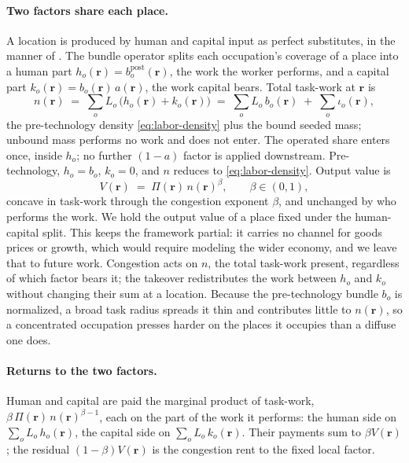 \documentclass[12pt, a4paper]{article}
\begin{document}
\paragraph{Two factors share each place.}
A location is produced by human and capital input as perfect
substitutes, in the manner of \textcite{acemoglu2018race}. The bundle
operator splits each occupation's coverage of a place into a human
part $h_o(\mathbf{r}) = b_o^{\text{post}}(\mathbf{r})$, the work the
worker performs, and a capital part
$k_o(\mathbf{r}) = b_o(\mathbf{r})\,a(\mathbf{r})$, the work capital
bears. Total task-work at $\mathbf{r}$ is
\begin{equation}
  n(\mathbf{r})
  \;=\;
  \sum_o L_o\,\bigl(h_o(\mathbf{r}) + k_o(\mathbf{r})\bigr)
  \;=\;
  \sum_o L_o\, b_o(\mathbf{r}) \;+\; \sum_o \iota_o(\mathbf{r}),
  \label{eq:taskwork-density}
\end{equation}
the pre-technology density \eqref{eq:labor-density} plus the bound
seeded mass; unbound mass performs no work and does not enter. The
operated share enters once, inside $h_o$; no further $(1 - a)$ factor
is applied downstream. Pre-technology, $h_o = b_o$, $k_o = 0$, and
$n$ reduces to \eqref{eq:labor-density}. Output value is
\begin{equation}
  V(\mathbf{r})
  \;=\;
  \Pi(\mathbf{r})\, n(\mathbf{r})^{\beta},
  \qquad \beta \in (0,1),
  \label{eq:place-output}
\end{equation}
concave in task-work through the congestion exponent $\beta$, and
unchanged by who performs the work. We hold the output value of a place
fixed under the human-capital split. This keeps the framework partial:
it carries no channel for goods prices or growth, which would require
modeling the wider economy, and we leave that to future work.
Congestion acts on $n$, the total task-work present, regardless of
which factor bears it; the takeover redistributes the work between
$h_o$ and $k_o$ without changing their sum at a location. Because
the pre-technology bundle $b_o$ is normalized, a broad task radius spreads it thin and
contributes little to $n(\mathbf{r})$, so a concentrated occupation
presses harder on the places it occupies than a diffuse one does.

\paragraph{Returns to the two factors.}
Human and capital are paid the marginal product of task-work,
$\beta\,\Pi(\mathbf{r})\, n(\mathbf{r})^{\beta-1}$, each on the part of
the work it performs: the human side on
$\sum_o L_o\, h_o(\mathbf{r})$, the capital side on
$\sum_o L_o\, k_o(\mathbf{r})$. Their payments sum to
$\beta V(\mathbf{r})$; the residual $(1-\beta)V(\mathbf{r})$ is the
congestion rent to the fixed local factor.
\end{document}
